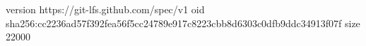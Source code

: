 version https://git-lfs.github.com/spec/v1
oid sha256:cc2236ad57f392fea56f5cc24789e917c8223cbb8d6303c0dfb9ddc34913f07f
size 22000
